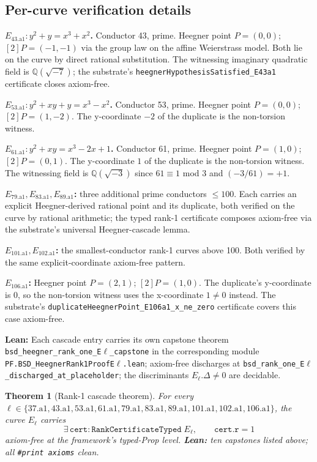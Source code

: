 \documentclass[11pt,a4paper]{article}
\theoremstyle{plain}
\newtheorem{theorem}{Theorem}[section]
\theoremstyle{definition}
\begin{document}
\subsection*{Per-curve verification details}

\textbf{$E_{43.\mathrm{a}1}\colon y^{2} + y = x^{3} + x^{2}$.}
Conductor 43, prime. Heegner point $P = (0,0)$;
$[2]P = (-1,-1)$ via the group law on the affine Weierstrass model.
Both lie on the curve by direct rational substitution. The
witnessing imaginary quadratic field is $\mathbb{Q}(\sqrt{-7})$;
the substrate's
\texttt{heegnerHypothesisSatisfied\_E43a1} certificate closes
axiom-free.

\textbf{$E_{53.\mathrm{a}1}\colon y^{2} + xy + y = x^{3} - x^{2}$.}
Conductor 53, prime. Heegner point $P = (0,0)$; $[2]P = (1,-2)$.
The y-coordinate $-2$ of the duplicate is the non-torsion witness.

\textbf{$E_{61.\mathrm{a}1}\colon y^{2} + xy = x^{3} - 2x + 1$.}
Conductor 61, prime. Heegner point $P = (1,0)$; $[2]P = (0,1)$.
The y-coordinate $1$ of the duplicate is the non-torsion witness.
The witnessing field is $\mathbb{Q}(\sqrt{-3})$ since $61 \equiv 1$
mod $3$ and $(-3/61) = +1$.

\textbf{$E_{79.\mathrm{a}1}, E_{83.\mathrm{a}1}, E_{89.\mathrm{a}1}$:}
three additional prime conductors $\le 100$. Each carries an
explicit Heegner-derived rational point and its duplicate, both
verified on the curve by rational arithmetic; the typed rank-1
certificate composes axiom-free via the substrate's universal
Heegner-cascade lemma.

\textbf{$E_{101.\mathrm{a}1}, E_{102.\mathrm{a}1}$:} the
smallest-conductor rank-1 curves above 100. Both verified by the
same explicit-coordinate axiom-free pattern.

\textbf{$E_{106.\mathrm{a}1}$:} Heegner point $P = (2,1)$;
$[2]P = (1, 0)$. The duplicate's y-coordinate is $0$, so the
non-torsion witness uses the x-coordinate $1 \ne 0$ instead. The
substrate's
\texttt{duplicateHeegnerPoint\_E106a1\_x\_ne\_zero}
certificate covers this case axiom-free.

\textbf{Lean:} Each cascade entry carries its own capstone theorem
\texttt{bsd\_heegner\_rank\_one\_E$\ell$\_capstone} in the
corresponding module
\texttt{PF.BSD\_HeegnerRank1ProofE$\ell$.lean}; axiom-free
discharges at
\texttt{bsd\_rank\_one\_E$\ell$\_discharged\_at\_placeholder}; the
discriminants $E_{\ell}.\Delta \ne 0$ are decidable.

\begin{theorem}[Rank-1 cascade theorem]
\label{thm:rank1-cascade}
For every $\ell \in \{37.\mathrm{a}1, 43.\mathrm{a}1, 53.\mathrm{a}1,
61.\mathrm{a}1, 79.\mathrm{a}1, 83.\mathrm{a}1, 89.\mathrm{a}1,
101.\mathrm{a}1, 102.\mathrm{a}1, 106.\mathrm{a}1\}$, the curve
$E_{\ell}$ carries
\[
\exists\,\mathtt{cert} : \mathtt{RankCertificateTyped}\;E_{\ell},
\qquad \mathtt{cert}.\mathtt{r} = 1
\]
axiom-free at the framework's typed-Prop level.
\textbf{Lean:} ten capstones listed above; all
\texttt{\#print axioms} clean.
\end{theorem}
\end{document}
